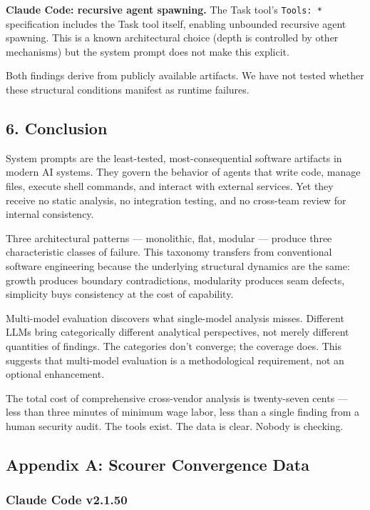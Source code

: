 \documentclass[
]{article}
\begin{document}
\textbf{Claude Code: recursive agent spawning.} The Task tool's
\texttt{Tools:\ *} specification includes the Task tool itself, enabling
unbounded recursive agent spawning. This is a known architectural choice
(depth is controlled by other mechanisms) but the system prompt does not
make this explicit.

Both findings derive from publicly available artifacts. We have not
tested whether these structural conditions manifest as runtime failures.

\hypertarget{conclusion}{%
\subsection{6. Conclusion}\label{conclusion}}

System prompts are the least-tested, most-consequential software
artifacts in modern AI systems. They govern the behavior of agents that
write code, manage files, execute shell commands, and interact with
external services. Yet they receive no static analysis, no integration
testing, and no cross-team review for internal consistency.

Three architectural patterns --- monolithic, flat, modular --- produce
three characteristic classes of failure. This taxonomy transfers from
conventional software engineering because the underlying structural
dynamics are the same: growth produces boundary contradictions,
modularity produces seam defects, simplicity buys consistency at the
cost of capability.

Multi-model evaluation discovers what single-model analysis misses.
Different LLMs bring categorically different analytical perspectives,
not merely different quantities of findings. The categories don't
converge; the coverage does. This suggests that multi-model evaluation
is a methodological requirement, not an optional enhancement.

The total cost of comprehensive cross-vendor analysis is twenty-seven
cents --- less than three minutes of minimum wage labor, less than a
single finding from a human security audit. The tools exist. The data is
clear. Nobody is checking.

\hypertarget{appendix-a-scourer-convergence-data}{%
\subsection{Appendix A: Scourer Convergence
Data}\label{appendix-a-scourer-convergence-data}}

\hypertarget{claude-code-v2.1.50}{%
\subsubsection{Claude Code v2.1.50}\label{claude-code-v2.1.50}}
\end{document}
